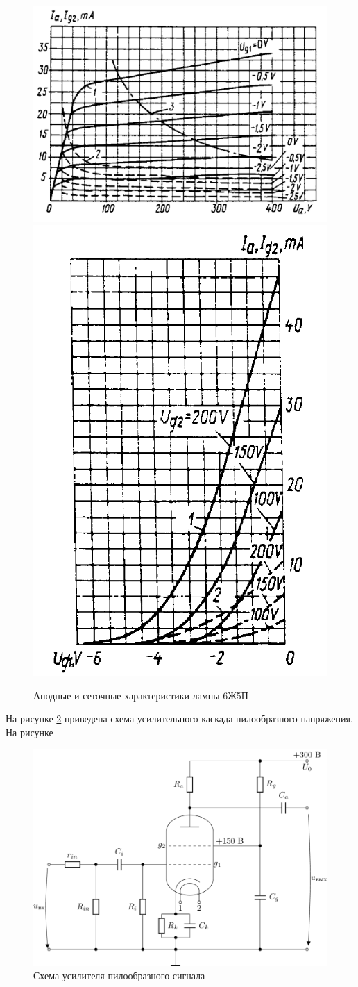 \documentclass[a4paper,14pt]{extarticle}
\begin{document}
    \begin{figure}[!h]
    	\begin{center}
    		\includegraphics[width=.6\textwidth]{images/6z5p1.png}
    		\includegraphics[width=.3\textwidth]{images/6z5p2.png}
    	\end{center}
    	\caption{Анодные и сеточные характеристики лампы 6Ж5П}
    	\label{fig6z5p}
    \end{figure}
    
    На рисунке \ref{figcasc} приведена схема усилительного каскада пилообразного напряжения. На рисунке 
    
    \begin{figure}[!h]
        \begin{center}
            \includegraphics[width=.4\textwidth]{images/amplifier.png}
        \end{center}
        \caption{Схема усилителя пилообразного сигнала}
        \label{figcasc}
    \end{figure}
    
\end{document}
